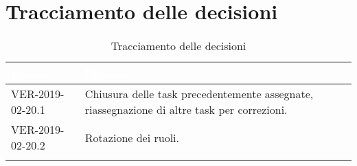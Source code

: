 \section{Tracciamento delle decisioni}

\begin{longtable}{|C{.40\textwidth}|C{.60\textwidth}|}
\hline
{}\textbf{\textcolor{white}{Codice}} & \textbf{\textcolor{white}{Decisione}}\\
\hline
VER-2019-02-20.1 & Chiusura delle task precedentemente assegnate, riassegnazione di altre task per correzioni.\\
\hline
{}VER-2019-02-20.2 & Rotazione dei ruoli.\\
\hline
\caption{Tracciamento delle decisioni}
\end{longtable}
